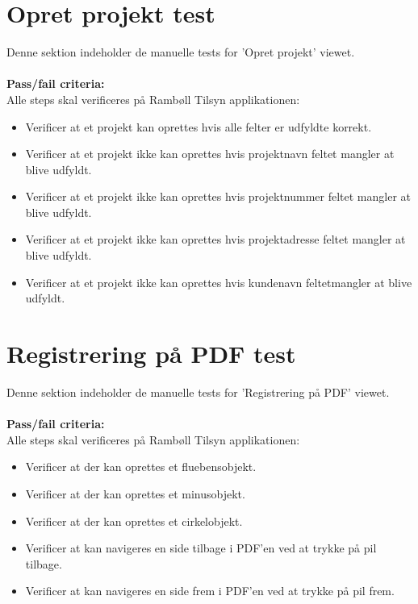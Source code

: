 \clearpage

\section{Opret projekt test}
Denne sektion indeholder de manuelle tests for 'Opret projekt' viewet. \\ \\
\textbf{Pass/fail criteria:} \\
Alle steps skal verificeres på Rambøll Tilsyn applikationen:
\begin{itemize}[-]
	\item Verificer at et projekt kan oprettes hvis alle felter er udfyldte korrekt.
	\item Verificer at et projekt ikke kan oprettes hvis projektnavn feltet mangler at blive udfyldt.
	\item Verificer at et projekt ikke kan oprettes hvis projektnummer feltet mangler at blive udfyldt.
	\item Verificer at et projekt ikke kan oprettes hvis projektadresse feltet mangler at blive udfyldt.
	\item Verificer at et projekt ikke kan oprettes hvis kundenavn feltetmangler at blive udfyldt. \\
\end{itemize}

\section{Registrering på PDF test}
Denne sektion indeholder de manuelle tests for 'Registrering på PDF' viewet. \\ \\
\textbf{Pass/fail criteria:} \\
Alle steps skal verificeres på Rambøll Tilsyn applikationen:
\begin{itemize}[-]
	\item Verificer at der kan oprettes et fluebensobjekt.
	\item Verificer at der kan oprettes et minusobjekt.
	\item Verificer at der kan oprettes et cirkelobjekt.
	\item Verificer at kan navigeres en side tilbage i PDF'en ved at trykke på pil tilbage.
	\item Verificer at kan navigeres en side frem i PDF'en ved at trykke på pil frem. \\
\end{itemize}

